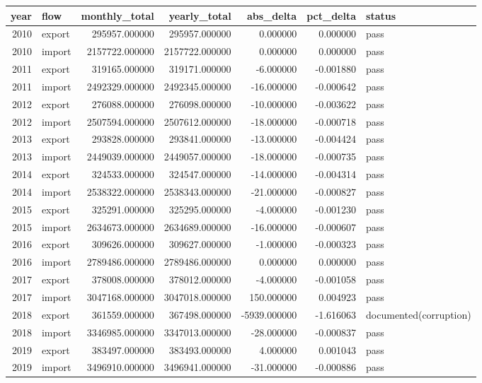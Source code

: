 \begin{tabular}{rlrrrrl}
\toprule
year & flow & monthly_total & yearly_total & abs_delta & pct_delta & status \\
\midrule
2010 & export & 295957.000000 & 295957.000000 & 0.000000 & 0.000000 & pass \\
2010 & import & 2157722.000000 & 2157722.000000 & 0.000000 & 0.000000 & pass \\
2011 & export & 319165.000000 & 319171.000000 & -6.000000 & -0.001880 & pass \\
2011 & import & 2492329.000000 & 2492345.000000 & -16.000000 & -0.000642 & pass \\
2012 & export & 276088.000000 & 276098.000000 & -10.000000 & -0.003622 & pass \\
2012 & import & 2507594.000000 & 2507612.000000 & -18.000000 & -0.000718 & pass \\
2013 & export & 293828.000000 & 293841.000000 & -13.000000 & -0.004424 & pass \\
2013 & import & 2449039.000000 & 2449057.000000 & -18.000000 & -0.000735 & pass \\
2014 & export & 324533.000000 & 324547.000000 & -14.000000 & -0.004314 & pass \\
2014 & import & 2538322.000000 & 2538343.000000 & -21.000000 & -0.000827 & pass \\
2015 & export & 325291.000000 & 325295.000000 & -4.000000 & -0.001230 & pass \\
2015 & import & 2634673.000000 & 2634689.000000 & -16.000000 & -0.000607 & pass \\
2016 & export & 309626.000000 & 309627.000000 & -1.000000 & -0.000323 & pass \\
2016 & import & 2789486.000000 & 2789486.000000 & 0.000000 & 0.000000 & pass \\
2017 & export & 378008.000000 & 378012.000000 & -4.000000 & -0.001058 & pass \\
2017 & import & 3047168.000000 & 3047018.000000 & 150.000000 & 0.004923 & pass \\
2018 & export & 361559.000000 & 367498.000000 & -5939.000000 & -1.616063 & documented(corruption) \\
2018 & import & 3346985.000000 & 3347013.000000 & -28.000000 & -0.000837 & pass \\
2019 & export & 383497.000000 & 383493.000000 & 4.000000 & 0.001043 & pass \\
2019 & import & 3496910.000000 & 3496941.000000 & -31.000000 & -0.000886 & pass \\

\end{tabular}
